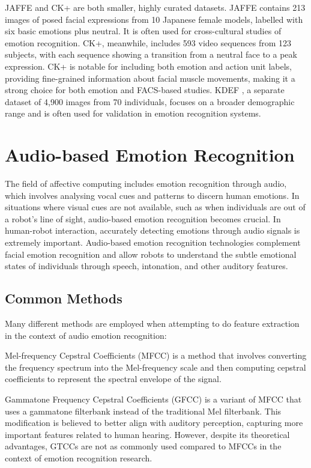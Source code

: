 JAFFE \cite{jaffe}  and CK+ are both smaller, highly curated datasets. JAFFE contains 213 images of posed facial expressions from 10 Japanese female models, labelled with six basic emotions plus neutral. It is often used for cross-cultural studies of emotion recognition. CK+, meanwhile, includes 593 video sequences from 123 subjects, with each sequence showing a transition from a neutral face to a peak expression. CK+ is notable for including both emotion and action unit labels, providing fine-grained information about facial muscle movements, making it a strong choice for both emotion and FACS-based studies. KDEF \cite{Lundqvist2015-in}, a separate dataset of 4,900 images from 70 individuals, focuses on a broader demographic range and is often used for validation in emotion recognition systems.

\section{Audio-based Emotion Recognition}

The field of affective computing includes emotion recognition through audio, which involves analysing vocal cues and patterns to discern human emotions. In situations where visual cues are not available, such as when individuals are out of a robot's line of sight, audio-based emotion recognition becomes crucial. In human-robot interaction, accurately detecting emotions through audio signals is extremely important. Audio-based emotion recognition technologies complement facial emotion recognition and allow robots to understand the subtle emotional states of individuals through speech, intonation, and other auditory features.

\subsection{Common Methods}
Many different methods are employed when attempting to do feature extraction in the context of audio emotion recognition:

Mel-frequency Cepstral Coefficients (MFCC) \cite{Ali2021-ie} is a method that involves converting the frequency spectrum into the Mel-frequency scale and then computing cepstral coefficients to represent the spectral envelope of the signal.

Gammatone Frequency Cepstral Coefficients (GFCC) \cite{Shi2016-th} is a variant of MFCC that uses a gammatone filterbank instead of the traditional Mel filterbank. This modification is believed to better align with auditory perception, capturing more important features related to human hearing. However, despite its theoretical advantages, GTCCs are not as commonly used compared to MFCCs in the context of emotion recognition research.

